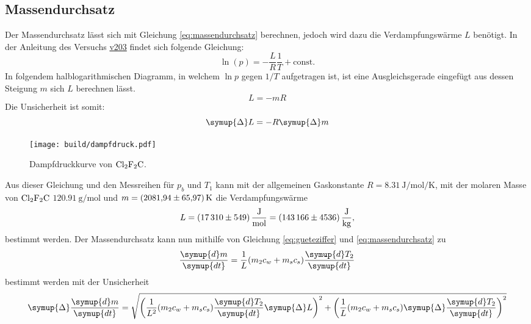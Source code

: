 \subsection{Massendurchsatz}
Der Massendurchsatz lässt sich mit Gleichung \eqref{eq:massendurchsatz} berechnen, jedoch wird dazu die Verdampfungswärme
$L$ benötigt.
In der Anleitung des Versuchs \href{http://129.217.224.2/HOMEPAGE/PHYSIKER/BACHELOR/AP/SKRIPT/V203.pdf}{v203} findet sich
folgende Gleichung:
\begin{equation}
    \ln \left(p\right) = -\frac{L}{R} \frac{1}{T} + \text{const.}
\end{equation}
In folgendem halblogarithmischen Diagramm, in welchem $\ln{p}$ gegen $1/T$ 
aufgetragen ist, ist eine Ausgleichsgerade eingefügt aus dessen Steigung $m$ sich $L$ berechnen 
lässt.
\begin{equation}
    L = -mR
\end{equation}
Die Unsicherheit ist somit:
\begin{equation}
    \symup{\Delta}L = -R\symup{\Delta}m
\end{equation}
\begin{figure}[H]
    \centering
    \texttt{[image: build/dampfdruck.pdf]}
    \caption{Dampfdruckkurve von $\ce{Cl2F2C}$.}
\end{figure}
%
\noindent Aus dieser Gleichung und den Messreihen für $p_b$ und $T_1$ kann mit der allgemeinen 
Gaskonstante \mbox{$R=\SI{8.31}{\joule\per\mole\per\kelvin}$}, mit der molaren Masse von $\ce{Cl2F2C}$ \mbox{$\SI{120.91}{\gram\per\mole}$\cite{molar}} 
und \mbox{$m = \SI{2081.94\pm65.97}{\kelvin}$} die Verdampfungswärme
\begin{equation*}
L=\SI{17310\pm549}{\joule\per\mole}=\SI{143166\pm4536}{\joule\per\kilogram},
\end{equation*}
bestimmt werden.
%
Der Massendurchsatz kann nun mithilfe von Gleichung \eqref{eq:gueteziffer} und \eqref{eq:massendurchsatz} 
zu
\begin{equation}
    \frac{\symup{d}m}{\symup{dt}} = \frac{1}{L}(m_2c_w + m_sc_s)\frac{\symup{d}T_2}{\symup{dt}}
\end{equation}
bestimmt werden mit der Unsicherheit
\begin{equation}
    \symup{\Delta}\frac{\symup{d}m}{\symup{dt}} = 
    \sqrt{
        \left(\frac{1}{L^2}(m_2c_w + m_sc_s)\frac{\symup{d}T_2}{\symup{dt}}\symup{\Delta}L\right)^2 + 
        \left(\frac{1}{L}(m_2c_w + m_sc_s)\symup{\Delta}\frac{\symup{d}T_2}{\symup{dt}}\right)^2
    }
\end{equation}
